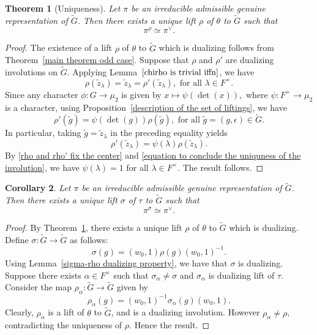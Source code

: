 \documentclass[11pt, a4paper, reqno]{amsart}
\newtheorem{theorem}{Theorem}[section]
\newtheorem{corollary}[theorem]{Corollary}
\theoremstyle{definition}
\theoremstyle{remark}
\theoremstyle{example}
\theoremstyle{note}
\numberwithin{equation}{section}
\begin{document}
    




\begin{theorem}[Uniqueness]\label{Uniqueness of dualizing involution} Let $\pi$ be an irreducible admissible genuine representation of $\widetilde{G}$. Then there exists a unique lift $\rho$ of $\theta$ to $\widetilde{G}$ such that
\[\pi^{\rho}\simeq \pi^{\vee}.\]
\end{theorem}

\begin{proof} The existence of a lift $\rho$ of $\theta$ to $\widetilde{G}$ which is dualizing follows from Theorem~\ref{main theorem odd case}. Suppose that $\rho$ and $\rho'$ are dualizing involutions on $\widetilde{G}$. Applying Lemma~$\ref{chirho is trivial iffn}$, we have %
\begin{equation}\label{rho and rho' fix the center}
\rho(\tilde{z}_{\lambda})=\tilde{z}_{\lambda}=\rho'(\tilde{z}_{\lambda}), \text{ for all } \lambda \in F^{\times}.
\end{equation}
Since any character $\phi:G \to \mu_{2}$ is given by $x \mapsto \psi(\det(x) ),$ where  $\psi: F^{\times} \to \mu_{2}$ is a character, using Proposition~\ref{description of the set of liftings}, we have $$\rho'(\tilde{g})=\psi(\det(g))\rho(\tilde{g}), \text{ for all } \tilde{g} = (g, \epsilon) \in \widetilde{G}.$$
In particular, taking $\tilde{g} = \tilde{z}_{\lambda}$ in the preceding equality yields
\begin{equation}\label{equation to conclude the uniquness of the involution}
\rho'(\tilde{z}_{\lambda})=\psi(\lambda)\rho(\tilde{z}_{\lambda}).
\end{equation}
By \eqref{rho and rho' fix the center} and \eqref{equation to conclude the uniquness of the involution}, we have $\psi(\lambda)=1$ for all $\lambda\in F^{\times}.$ The result follows. 
\end{proof}


\begin{corollary}\label{Uniqueness of lift sigma} Let $\pi$ be an irreducible admissible genuine representation of $\widetilde{G}$.  Then there exists a unique lift $\sigma$ of $\tau$ to $\widetilde{G}$ such that
\[\pi^{\sigma}\simeq \pi^{\vee}.\]
\end{corollary}

\begin{proof}
By Theorem~\ref{Uniqueness of dualizing involution}, there exists a unique lift $\rho$ of $\theta$ to $\widetilde{G}$ which is dualizing. Define $\sigma: \widetilde{G} \to \widetilde{G}$ as follows: 
\[\sigma(g)=(w_0,1)\rho(g)(w_0,1)^{-1}.\]
Using Lemma~\ref{sigma-rho dualizing property}, we have that $\sigma$ is dualizing. Suppose there exists $\alpha \in F^\times$ such that $\sigma_{\alpha}\neq \sigma$ and ${\sigma_\alpha}$ is dualizing lift of $\tau$. Consider the map $\rho_{\alpha}: \widetilde{G} \to \widetilde{G}$ given by $$\rho_\alpha(g)=(w_0,1)^{-1}\sigma_{\alpha}(g)(w_0,1).$$ Clearly, $\rho_\alpha$ is a lift of $\theta$ to $\widetilde{G}$, and is a dualizing involution. However $\rho_\alpha \neq \rho$, contradicting the uniqueness of $\rho.$ Hence the result. \qedhere
\end{proof}
\end{document}
